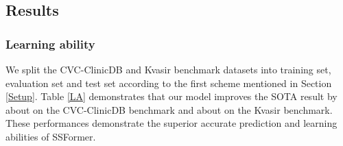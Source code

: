 \documentclass[runningheads]{llncs}
\begin{document}
\subsection{Results}


\subsubsection{Learning ability}
 We split the CVC-ClinicDB and Kvasir benchmark datasets into  training set,  evaluation set and  test set according to the first scheme mentioned in Section \ref{Setup}. Table \ref{LA} demonstrates that our model improves the SOTA result by about  on the CVC-ClinicDB benchmark and about  on the Kvasir benchmark. These performances demonstrate the superior accurate prediction and learning abilities of SSFormer.
\end{document}
